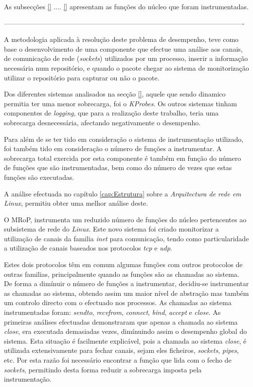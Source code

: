 As subsecções \ref{} .... \ref{} apresentam as funções do núcleo que foram instrumentadas.

%
%

----------------------------------------------------------------------------------------------------------

A metodologia aplicada à resolução deste problema de desempenho, teve como base o desenvolvimento de uma componente que efectue uma análise aos canais, de comunicação de rede (\textit{sockets}) utilizados por um processo, inserir a informação necessária num repositório, e quando o pacote chegar ao sistema de monitorização utilizar o repositório para capturar ou não o pacote.

Dos diferentes sistemas analisados na secção \ref{}, aquele que sendo dinamico permitia ter uma menor sobrecarga, foi o \textit{KProbes}.
Os outros sistemas tinham componentes de \textit{logging}, que para a realização deste trabalho, teria uma sobrecarga desnecessária, afectando negativamente o desempenho.

Para além de se ter tido em consideração o sistema de instrumentação utilizado, foi também tido em consideração o número de funções a instrumentar.
A sobrecarga total exercida por esta componente é também em função do número de funções que são instrumentadas, bem como do número de vezes que estas funções são executadas.

A análise efectuada no capítulo \ref{cap:Estrutura} sobre a \textit{Arquitectura de rede em Linux}, permitiu obter uma melhor análise deste.

O MRoP, instrumenta um reduzido número de funções do núcleo pertencentes ao subsistema de rede do \textit{Linux}.
Este novo sistema foi criado monitorizar a utilização de canais da familia \textit{inet} para comunicação, tendo como particularidade a utilização de canais baseados nos protocolos \textit{tcp} e \textit{udp}.


Estes dois protocolos têm em comum algumas funções com outros protocolos de outras familias, principalmente quando as funções são as chamadas ao sistema.
De forma a dimínuir o número de funções a instrumentar, decidiu-se instrumentar as chamadas ao sistema, obtendo assim um maior nível de abstração mas também um controlo directo com o efectuado nos processos.
As chamadas ao sistema instrumentadas foram: \textit{sendto}, \textit{recvfrom}, \textit{connect}, \textit{bind}, \textit{accept} e \textit{close}.
As primeiras análises efectuadas demonstraram que apenas a chamada ao sistema \textit{close}, era executada demasiadas vezes, dimínuindo assim o desempenho global do sistema.
Esta situação é facilmente explicável, pois a chamada ao sistema \textit{close}, é utilizada extensivamente para fechar canais, sejam eles ficheiros, \textit{sockets}, \textit{pipes}, etc.
Por esta razão foi necessário encontrar a função que lida com o fecho de \textit{sockets}, permitindo desta forma reduzir a sobrecarga imposta pela instrumentação.


